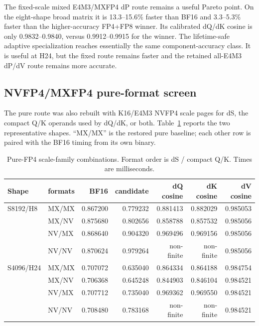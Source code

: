 The fixed-scale mixed E4M3/MXFP4 dP route remains a useful Pareto point.  On
the eight-shape broad matrix it is 13.3--15.6\% faster than BF16 and
3.3--5.3\% faster than the higher-accuracy FP4+FP8 winner.  Its calibrated
dQ/dK cosine is only 0.9832--0.9840, versus 0.9912--0.9915 for the winner.
The lifetime-safe adaptive specialization reaches essentially the same
component-accuracy class.  It is useful at H24, but the fixed route remains
faster and the retained all-E4M3 dP/dV route remains more accurate.

\subsection{NVFP4/MXFP4 pure-format screen}

The pure route was also rebuilt with K16/E4M3 NVFP4 scale pages for dS, the
compact Q/K operands used by dQ/dK, or both.  Table~\ref{tab:pure-format-screen}
reports the two representative shapes.  ``MX/MX'' is the restored pure
baseline; each other row is paired with the BF16 timing from its own binary.

\begin{table}[htbp]
\centering
\caption{Pure-FP4 scale-family combinations.  Format order is dS / compact
Q/K.  Times are milliseconds.}
\label{tab:pure-format-screen}
\scriptsize
\begin{tabular}{l l rr rrr}
\toprule
Shape & formats & BF16 & candidate & dQ cosine & dK cosine & dV cosine \\
\midrule
S8192/H8  & MX/MX & 0.867200 & 0.779232 & 0.881413 & 0.882029 & 0.985053 \\
            & MX/NV & 0.875680 & 0.802656 & 0.858788 & 0.857532 & 0.985056 \\
            & NV/MX & 0.868640 & 0.904320 & 0.969496 & 0.969156 & 0.985056 \\
            & NV/NV & 0.870624 & 0.979264 & non-finite & non-finite & 0.985056 \\
S4096/H24 & MX/MX & 0.707072 & 0.635040 & 0.864334 & 0.864188 & 0.984754 \\
            & MX/NV & 0.706368 & 0.645248 & 0.844903 & 0.846104 & 0.984521 \\
            & NV/MX & 0.707712 & 0.735040 & 0.969362 & 0.969550 & 0.984521 \\
            & NV/NV & 0.708480 & 0.783168 & non-finite & non-finite & 0.984521 \\
\bottomrule
\end{tabular}
\end{table}

